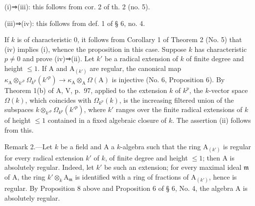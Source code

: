 (i)⇒(iii): this follows from cor. 2 of th. 2 (no. 5).

(iii)⇒(iv): this follows from def. 1 of § 6, no. 4.

If \(k\) is of characteristic 0, it follows from Corollary 1 of Theorem 2 (No. 5) that (iv) implies (i), whence the proposition in this case. Suppose \(k\) has characteristic \(p \neq 0\) and prove (iv)⇒(ii). Let \(k'\) be a radical extension of \(k\) of finite degree and height \(\leqslant 1\). If A and \(\mathrm{A}_{(k')}\) are regular, the canonical map \(\kappa_{\mathrm{A}} \otimes_{k'^{p}} \Omega_{k^{p}}(k'^{p}) \longrightarrow \kappa_{\mathrm{A}} \otimes_{\mathrm{A}} \Omega(\mathrm{A})\) is injective (No. 6, Proposition 6). By Theorem 1(b) of A, V, p.~97, applied to the extension \(k\) of \(k^{p}\), the \(k\)-vector space \(\Omega(k)\), which coincides with \(\Omega_{k^{p}}(k)\), is the increasing filtered union of the subspaces \(k \otimes_{k'^{p}} \Omega_{k^{p}}(k'^{p})\), where \(k'\) ranges over the finite radical extensions of \(k\) of height \(\leqslant 1\) contained in a fixed algebraic closure of \(k\). The assertion (ii) follows from this.

Remark 2.—Let \(k\) be a field and A a \(k\)-algebra such that the ring \(\mathrm{A}_{(k')}\) is regular for every radical extension \(k'\) of \(k\), of finite degree and height \(\leqslant 1\); then A is absolutely regular. Indeed, let \(k'\) be such an extension; for every maximal ideal \(\mathfrak{m}\) of A, the ring \(k'\otimes_k\mathrm{A}_{\mathfrak{m}}\) is identified with a ring of fractions of \(\mathrm{A}_{(k')}\), hence is regular. By Proposition 8 above and Proposition 6 of § 6, No. 4, the algebra A is absolutely regular.

